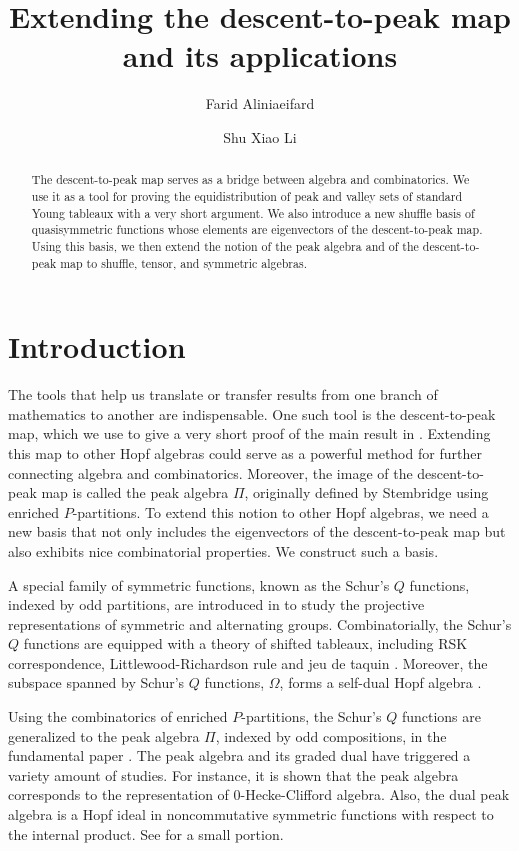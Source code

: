 \documentclass[12pt]{amsart}
\title{Extending the descent-to-peak map and its applications}
\author{Farid Aliniaeifard}
\author{Shu Xiao Li}
\date{}
\numberwithin{equation}{section}
\begin{document}
\maketitle

\begin{abstract}
The descent-to-peak map serves as a bridge between algebra and combinatorics. We use it as a tool for proving the equidistribution of peak and valley sets of standard Young tableaux with a very short argument. We also introduce a new shuffle basis of quasisymmetric functions whose elements are eigenvectors of the descent-to-peak map. Using this basis, we then extend the notion of the peak algebra and of the descent-to-peak map to shuffle, tensor, and symmetric algebras.  
	 
\end{abstract}

\tableofcontents

\section{Introduction}

The tools that help us translate or transfer results from one branch of mathematics to another are indispensable. One such tool is the descent-to-peak map, which we use to give a very short proof of the main result in \cite{Z24}. Extending this map to other Hopf algebras could serve as a powerful method for further connecting algebra and combinatorics. Moreover, the image of the descent-to-peak map is called the peak algebra $\Pi$, originally defined by Stembridge using enriched $P$-partitions. To extend this notion to other Hopf algebras, we need a new basis that not only includes the eigenvectors of the descent-to-peak map but also exhibits nice combinatorial properties. We construct such a basis.

A special family of symmetric functions, known as the Schur's $Q$ functions, indexed by odd partitions, are introduced in \cite{S11} to study the projective representations of symmetric and alternating groups. Combinatorially, the Schur's $Q$ functions are equipped with a theory of shifted tableaux, including RSK correspondence, Littlewood-Richardson rule and jeu de taquin \cite{S87, S89, W84}. Moreover, the subspace spanned by Schur's $Q$ functions, $\Omega$, forms a self-dual Hopf algebra \cite{M95}.

Using the combinatorics of enriched $P$-partitions, the Schur's $Q$ functions are generalized to the peak algebra $\Pi$, indexed by odd compositions, in the fundamental paper \cite{S97}. The peak algebra and its graded dual have triggered a variety amount of studies. For instance, it is shown that the peak algebra corresponds to the representation of $0$-Hecke-Clifford algebra. Also, the dual peak algebra is a Hopf ideal in noncommutative symmetric functions with respect to the internal product. See \cite{B03, B02, B04, B14, H07, N03} for a small portion.
\end{document}
